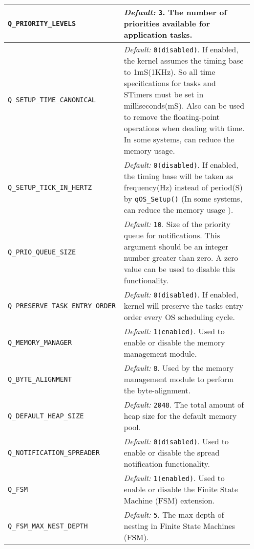\begin{center}
\begin{adjustbox}{center, width=\textwidth,totalheight={18cm},keepaspectratio}
\begin{tabularx}
{\textwidth}{l X}
\hline
{\lstinline!Q_PRIORITY_LEVELS!} & \textit{Default:} {\lstinline!3!}.  The number of priorities available for application tasks.\\
\hline
{\lstinline!Q_SETUP_TIME_CANONICAL!} & \textit{Default:}
{\lstinline!0(disabled)!}. If enabled, the kernel assumes the timing base to 1mS(1KHz). So all time specifications for tasks and STimers must be set in milliseconds(mS). Also can be used to remove the floating-point operations when dealing with time. In some systems, can reduce the memory usage. \\
\hline
{\lstinline!Q_SETUP_TICK_IN_HERTZ!} & \textit{Default:} {\lstinline!0(disabled)!}. If enabled, the timing base will be taken as frequency(Hz) instead of period(S) by {\lstinline!qOS_Setup()!} (In some systems, can reduce the memory usage ). \\
\hline
{\lstinline!Q_PRIO_QUEUE_SIZE!} & \textit{Default:} {\lstinline!10!}.  Size of the priority queue for notifications. This argument should be an integer number greater than zero. A zero value can be used to disable this functionality.\\
\hline
{\lstinline!Q_PRESERVE_TASK_ENTRY_ORDER !} & \textit{Default:} {\lstinline!0(disabled)!}. If enabled, kernel will preserve the tasks entry order every OS scheduling cycle.\\
\hline
{\lstinline!Q_MEMORY_MANAGER!} & \textit{Default:} {\lstinline!1(enabled)!}. Used to enable or disable the memory management module. \\
\hline
{\lstinline!Q_BYTE_ALIGNMENT!} & \textit{Default:} {\lstinline!8!}. Used by the memory management module to perform the byte-alignment. \\
\hline
{\lstinline!Q_DEFAULT_HEAP_SIZE!} & \textit{Default:} {\lstinline!2048!}. The total amount of heap size for the default memory pool. \\
\hline
{\lstinline!Q_NOTIFICATION_SPREADER!} & \textit{Default:} {\lstinline!0(disabled)!}. Used to enable or disable the spread notification functionality. \\
\hline
{\lstinline!Q_FSM!} & \textit{Default:} {\lstinline!1(enabled)!}.  Used to enable or disable the Finite State Machine (FSM) extension. \\
\hline
{\lstinline!Q_FSM_MAX_NEST_DEPTH!} & \textit{Default:} {\lstinline!5!}.  The max depth of nesting in Finite State Machines (FSM). \\

\end{tabularx}
\end{adjustbox}
\end{center}
